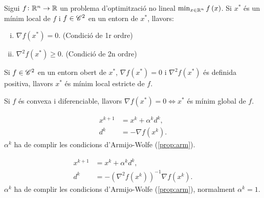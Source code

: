 \begin{teo*}
    Sigui $f \colon \mathbb{R}^n \to \mathbb{R}$ un problema d'optimitzaci\'o no lineal $\min_{x\in\mathbb{R}^n} f\left( x \right)$. Si $x^*$ \'es un m\'inim local de $f$ i $f \in \mathscr{C}^2$ en un entorn de $x^*$, llavors:
    \begin{enumerate}[i)]
        \item $\nabla f\left( x^* \right) = 0$. (Condici\'o de 1r ordre)
        \item $\nabla^2 f\left( x^* \right) \geq 0$. (Condici\'o de 2n ordre)
    \end{enumerate}
\end{teo*}
\begin{teo*}
    Si $f \in \mathscr{C}^2$ en un entorn obert de $x^*$, $\nabla f\left( x^* \right) = 0$ i $\nabla^2 f\left( x^* \right)$ \'es definida positiva, llavors $x^*$ \'es m\'inim local estricte de $f$.
\end{teo*}
\begin{teo*}
    Si $f$ \'es convexa i diferenciable, llavors $\nabla f\left( x^* \right) = 0 \iff x^*$ \'es m\'inim global de $f$.
\end{teo*}
\begin{met} 
    \begin{align*}
        x^{k+1} &= x^k + \alpha^kd^k, \\
        d^k &= -\nabla f\left( x^k \right).
    \end{align*}
    $\alpha^k$ ha de complir les condicions d'Armijo-Wolfe (\ref{prop:arm}).
\end{met}
\begin{met} 
    \begin{align*}
        x^{k+1} &= x^k + \alpha^kd^k, \\
        d^k &= -\left( \nabla^2 f\left( x^k \right) \right)^{-1} \nabla f\left( x^k \right).
    \end{align*}
    $\alpha^k$ ha de complir les condicions d'Armijo-Wolfe (\ref{prop:arm}), normalment $\alpha^k = 1$.
\end{met}
